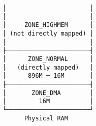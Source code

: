 \documentclass[varwidth]{standalone}
\begin{document}
\begin{verbatim}
│                       │ 
│                       │ 
│     ZONE_HIGHMEM      │
│ (not directly mapped) │
│                       │
├───────────────────────┤
│      ZONE_NORMAL      │
│   (directly mapped)   │
│      896M ─ 16M       │   
├───────────────────────┤
│       ZONE_DMA        │
│         16M           │
└───────────────────────┘
      Physical RAM
\end{verbatim}
\end{document}
